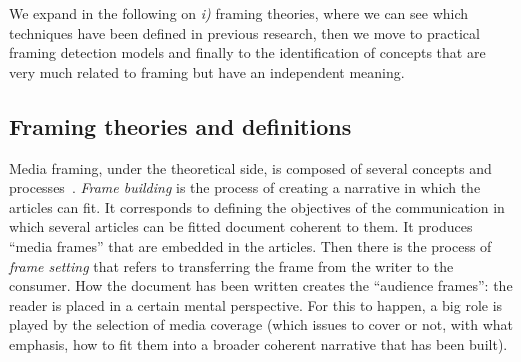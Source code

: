 
We expand in the following on \textit{i)} framing theories, where we can see which techniques have been defined in previous research, then we move to practical framing detection models and finally to the identification of concepts that are very much related to framing but have an independent meaning.

\subsection{Framing theories and definitions}
\label{ssec:lit_framing_theory}


Media framing, under the theoretical side, is composed of several concepts and processes~\cite{scheufele1999framing}.
\textit{Frame building} is the process of creating a narrative in which the articles can fit. It corresponds to defining the objectives of the communication in which several articles can be fitted document coherent to them.
It produces ``media frames'' that are embedded in the articles.
Then there is the process of \textit{frame setting} that refers to transferring the frame from the writer to the consumer. How the document has been written creates the ``audience frames'': the reader is placed in a certain mental perspective. For this to happen, a big role is played by the selection of media coverage (which issues to cover or not, with what emphasis, how to fit them into a broader coherent narrative that has been built).


